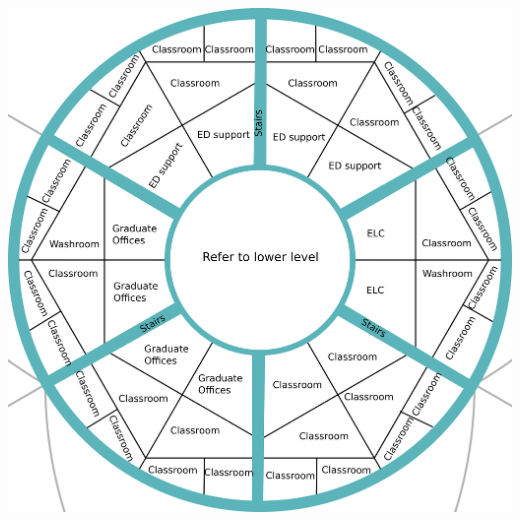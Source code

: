 \documentclass[CSHFoundation.tex]{subfiles}
\begin{document}
\centerline{\includegraphics[scale=0.04]{6-community centre floor 2.png}}
\end{document}
